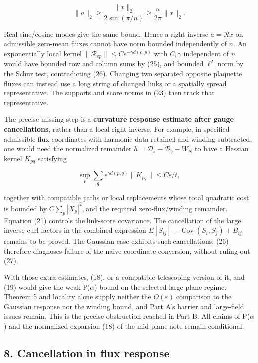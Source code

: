 \documentclass[11pt,a4paper]{article}
\begin{document}
\[\|a\|_2\ge\frac{\|x\|_2}{2\sin(\pi/n)}
\ge\frac{n}{2\pi}\|x\|_2.\tag{26}\]

Real sine/cosine modes give the same bound. Hence a right inverse
\(a=\mathcal R x\) on admissible zero-mean fluxes cannot have norm
bounded independently of \(n\). An exponentially local kernel
\(\|\mathcal R_{ep}\|\le C e^{-\gamma d(e,p)}\) with \(C,\gamma\)
independent of \(n\) would have bounded row and column sums by (25), and
bounded \(\ell^2\) norm by the Schur test, contradicting (26). Changing
two separated opposite plaquette fluxes can instead use a long string of
changed links or a spatially spread representative. The supports and
score norms in (23) then track that representative.

The precise missing step is a \textbf{curvature response estimate after
gauge cancellations}, rather than a local right inverse. For example, in
specified admissible flux coordinates with harmonic data retained and
winding subtracted, one would need the normalized remainder
\(h=\mathcal D_s-\mathcal D_0-W_N\) to have a Hessian kernel \(K_{pq}\)
satisfying

\[\sup_p\sum_q e^{\gamma d(p,q)}\|K_{pq}\|
\le C\varepsilon/t,\tag{27}\]

together with compatible paths or local replacements whose total
quadratic cost is bounded by \(C\sum_p|X_p|^2\), and the required
zero-flux/winding remainder. Equation (21) controls the link-score
covariance. The cancellation of the large inverse-curl factors in the
combined expression \(E[S_{ij}]-\operatorname{Cov}(S_i,S_j)+B_{ij}\)
remains to be proved. The Gaussian case exhibits such cancellations;
(26) therefore diagnoses failure of the naive coordinate conversion,
without ruling out (27).

With those extra estimates, (18), or a compatible telescoping version of
it, and (19) would give the weak P(\(\alpha\)) bound on the selected
large-plane regime. Theorem 5 and locality alone supply neither the
\(O(\varepsilon)\) comparison to the Gaussian response nor the winding
bound, and Part A's barrier and large-field issues remain. This is the
precise obstruction reached in Part B. All claims of P(\(\alpha\)) and
the normalized expansion (18) of the mid-plane note remain conditional.

\hypertarget{cancellation-in-flux-response}{%
\subsection{8. Cancellation in flux
response}\label{cancellation-in-flux-response}}
\end{document}
